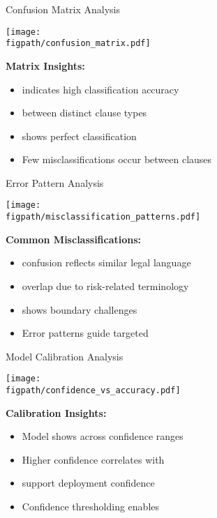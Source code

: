 \begin{frame}{Confusion Matrix Analysis}
\begin{center}
\texttt{[image: \\figpath/confusion\_matrix.pdf]}
\end{center}

\textbf{Matrix Insights:}
\begin{itemize}
    \item {} indicates high classification accuracy
    \item {} between distinct clause types
    \item {} shows perfect classification
    \item Few misclassifications occur between  clauses
\end{itemize}
\end{frame}

\begin{frame}{Error Pattern Analysis}
\begin{center}
\texttt{[image: \\figpath/misclassification\_patterns.pdf]}
\end{center}

\textbf{Common Misclassifications:}
\begin{itemize}
    \item {} confusion reflects similar legal language
    \item {} overlap due to risk-related terminology
    \item {} shows boundary challenges
    \item Error patterns guide targeted 
\end{itemize}
\end{frame}

\begin{frame}{Model Calibration Analysis}
\begin{center}
\texttt{[image: \\figpath/confidence\_vs\_accuracy.pdf]}
\end{center}

\textbf{Calibration Insights:}
\begin{itemize}
    \item Model shows  across confidence ranges
    \item Higher confidence correlates with 
    \item {} support deployment confidence
    \item Confidence thresholding enables 
\end{itemize}
\end{frame}

